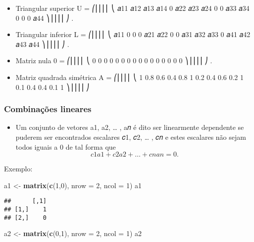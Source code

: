 \documentclass[
]{article}
\newenvironment{Shaded}{\begin{snugshade}}{\end{snugshade}}
\newcommand{\AttributeTok}[1]{\textcolor[rgb]{0.13,0.29,0.53}{#1}}
\newcommand{\DecValTok}[1]{\textcolor[rgb]{0.00,0.00,0.81}{#1}}
\newcommand{\FunctionTok}[1]{\textcolor[rgb]{0.13,0.29,0.53}{\textbf{#1}}}
\newcommand{\NormalTok}[1]{#1}
\newcommand{\OtherTok}[1]{\textcolor[rgb]{0.56,0.35,0.01}{#1}}
\providecommand{\tightlist}{%
  \setlength{\itemsep}{0pt}\setlength{\parskip}{0pt}}
\begin{document}
\begin{itemize}
\tightlist
\item
  Triangular superior U = ⎛⎜⎜⎜⎜ ⎝ 𝑎11 𝑎12 𝑎13 𝑎14 0 𝑎22 𝑎23 𝑎24 0 0 𝑎33
  𝑎34 0 0 0 𝑎44 ⎞⎟⎟⎟⎟ ⎠ .
\item
  Triangular inferior L = ⎛⎜⎜⎜⎜ ⎝ 𝑎11 0 0 0 𝑎21 𝑎22 0 0 𝑎31 𝑎32 𝑎33 0
  𝑎41 𝑎42 𝑎43 𝑎44 ⎞⎟⎟⎟⎟ ⎠ .
\item
  Matriz nula 0 = ⎛⎜⎜⎜⎜ ⎝ 0 0 0 0 0 0 0 0 0 0 0 0 0 0 0 0 ⎞⎟⎟⎟⎟ ⎠ .
\item
  Matriz quadrada simétrica A = ⎛⎜⎜⎜⎜ ⎝ 1 0.8 0.6 0.4 0.8 1 0.2 0.4 0.6
  0.2 1 0.1 0.4 0.4 0.1 1 ⎞⎟⎟⎟⎟ ⎠
\end{itemize}

\hypertarget{combinauxe7uxf5es-lineares}{%
\subsubsection{Combinações lineares}\label{combinauxe7uxf5es-lineares}}

\begin{itemize}
\tightlist
\item
  Um conjunto de vetores a1, a2, \ldots{} , a𝑛 é dito ser linearmente
  dependente se puderem ser encontrados escalares 𝑐1, 𝑐2, \ldots{} , 𝑐𝑛
  e estes escalares não sejam todos iguais a 0 de tal forma que \[
  𝑐1a1 + 𝑐2a2 + … + 𝑐𝑛a𝑛 = 0.
  \]
\end{itemize}

Exemplo:

\begin{Shaded}
\begin{Highlighting}[]
\NormalTok{a1 }\OtherTok{\textless{}{-}} \FunctionTok{matrix}\NormalTok{(}\FunctionTok{c}\NormalTok{(}\DecValTok{1}\NormalTok{,}\DecValTok{0}\NormalTok{), }\AttributeTok{nrow =} \DecValTok{2}\NormalTok{, }\AttributeTok{ncol =} \DecValTok{1}\NormalTok{)}
\NormalTok{a1}
\end{Highlighting}
\end{Shaded}

\begin{verbatim}
##      [,1]
## [1,]    1
## [2,]    0
\end{verbatim}

\begin{Shaded}
\begin{Highlighting}[]
\NormalTok{a2 }\OtherTok{\textless{}{-}} \FunctionTok{matrix}\NormalTok{(}\FunctionTok{c}\NormalTok{(}\DecValTok{0}\NormalTok{,}\DecValTok{1}\NormalTok{), }\AttributeTok{nrow =} \DecValTok{2}\NormalTok{, }\AttributeTok{ncol =} \DecValTok{1}\NormalTok{)}
\NormalTok{a2}
\end{Highlighting}
\end{Shaded}
\end{document}
